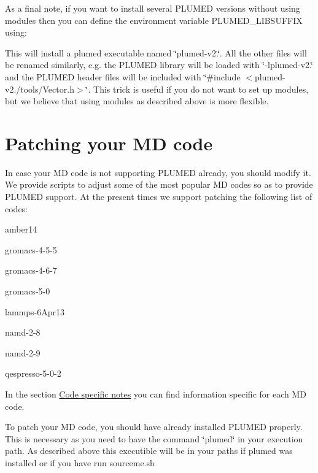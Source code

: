 As a final note, if you want to install several P\+L\+U\+M\+E\+D versions without using modules then you can define the environment variable P\+L\+U\+M\+E\+D\+\_\+\+L\+I\+B\+S\+U\+F\+F\+I\+X using\+: 
 This will install a plumed executable named \char`\"{}plumed-\/v2.\char`\"{}. All the other files will be renamed similarly, e.\+g. the P\+L\+U\+M\+E\+D library will be loaded with \char`\"{}-\/lplumed-\/v2.\char`\"{} and the P\+L\+U\+M\+E\+D header files will be included with \char`\"{}\#include $<$plumed-\/v2./tools/\+Vector.\+h$>$\char`\"{}. This trick is useful if you do not want to set up modules, but we believe that using modules as described above is more flexible.\hypertarget{_installation_Patching}{}\section{Patching your M\+D code}\label{_installation_Patching}
In case your M\+D code is not supporting P\+L\+U\+M\+E\+D already, you should modify it. We provide scripts to adjust some of the most popular M\+D codes so as to provide P\+L\+U\+M\+E\+D support. At the present times we support patching the following list of codes\+:


\begin{DoxyItemize}
\item amber14
\item gromacs-\/4-\/5-\/5
\item gromacs-\/4-\/6-\/7
\item gromacs-\/5-\/0
\item lammps-\/6\+Apr13
\item namd-\/2-\/8
\item namd-\/2-\/9
\item qespresso-\/5-\/0-\/2
\end{DoxyItemize}

In the section \hyperlink{CodeSpecificNotes}{Code specific notes} you can find information specific for each M\+D code.

To patch your M\+D code, you should have already installed P\+L\+U\+M\+E\+D properly. This is necessary as you need to have the command \char`\"{}plumed\char`\"{} in your execution path. As described above this executible will be in your paths if plumed was installed or if you have run sourceme.\+sh

